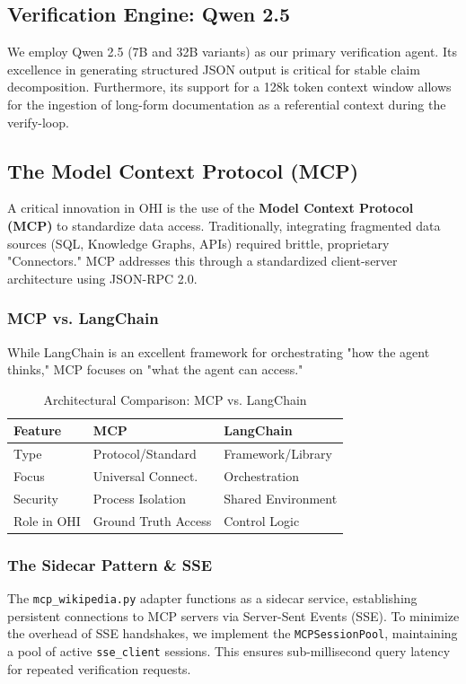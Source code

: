 \documentclass[10pt, a4paper, twocolumn]{article}
\begin{document}
\subsection{Verification Engine: Qwen 2.5}
We employ Qwen 2.5 (7B and 32B variants) as our primary verification agent. Its excellence in generating structured JSON output is critical for stable claim decomposition. Furthermore, its support for a 128k token context window allows for the ingestion of long-form documentation as a referential context during the verify-loop.

\subsection{The Model Context Protocol (MCP)}
A critical innovation in OHI is the use of the \textbf{Model Context Protocol (MCP)} to standardize data access. Traditionally, integrating fragmented data sources (SQL, Knowledge Graphs, APIs) required brittle, proprietary "Connectors." MCP addresses this through a standardized client-server architecture using JSON-RPC 2.0.

\subsubsection{MCP vs. LangChain}
While LangChain is an excellent framework for orchestrating "how the agent thinks," MCP focuses on "what the agent can access." 
\begin{table}[h]
\centering
\caption{Architectural Comparison: MCP vs. LangChain}
\begin{tabular}{@{}lll@{}}
\toprule
\textbf{Feature} & \textbf{MCP} & \textbf{LangChain} \\ \midrule
Type & Protocol/Standard & Framework/Library \\
Focus & Universal Connect. & Orchestration \\
Security & Process Isolation & Shared Environment \\
Role in OHI & Ground Truth Access & Control Logic \\ \bottomrule
\end{tabular}
\end{table}

\subsubsection{The Sidecar Pattern \& SSE}
The \texttt{mcp\_wikipedia.py} adapter functions as a sidecar service, establishing persistent connections to MCP servers via Server-Sent Events (SSE). To minimize the overhead of SSE handshakes, we implement the \texttt{MCPSessionPool}, maintaining a pool of active \texttt{sse\_client} sessions. This ensures sub-millisecond query latency for repeated verification requests.
\end{document}
